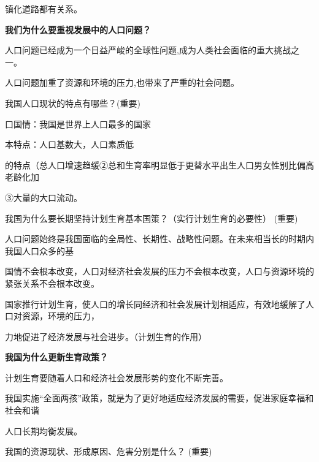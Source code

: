 \documentclass[lang=cn,11pt]{elegantbook}
\newcommand{\daofasym}[1]{{\daofasymbolfont #1}}
\newcommand{\daofasym}[1]{#1}
\begin{document}
镇化道路都有关系。\par

\textbf{我们为什么要重视发展中的人口问题？}\par

人口问题已经成为一个日益严峻的全球性问题,成为人类社会面临的重大挑战之一。\par

人口问题加重了资源和环境的压力,也带来了严重的社会问题。\par

我国人口现状的特点有哪些？(重要)\par

口国情：我国是世界上人口最多的国家\par

本特点：人口基数大，人口素质低\par

的特点（总人口增速趋缓\daofasym{②}总和生育率明显低于更替水平出生人口男女性别比偏高老龄化加\par

\daofasym{③}大量的大口流动。\par

我国为什么要长期坚持计划生育基本国策？（实行计划生育的必要性） (重要)\par

人口问题始终是我国面临的全局性、长期性、战略性问题。在未来相当长的时期内我国人口众多的基\par

国情不会根本改变，人口对经济社会发展的压力不会根本改变，人口与资源环境的紧张关系不会根本改变。\par

国家推行计划生育，使人口的增长同经济和社会发展计划相适应，有效地缓解了人口对资源，环境的压力，\par

力地促进了经济发展与社会进步。（计划生育的作用）\par

\textbf{我国为什么更新生育政策？}\par

计划生育要随着人口和经济社会发展形势的变化不断完善。\par

我国实施“全面两孩”政策，就是为了更好地适应经济发展的需要，促进家庭幸福和社会和谐\par

人口长期均衡发展。\par

我国的资源现状、形成原因、危害分别是什么？ (重要)\par
\end{document}
